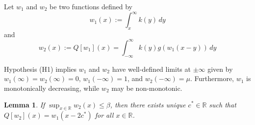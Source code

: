 \documentclass[11pt]{article}
\newtheorem{lem}[thm]{Lemma}
\theoremstyle{definition}
\numberwithin{equation}{section}
\numberwithin{thm}{section}
\renewcommand{\b}{\beta}
\newcommand{\m}{\mu}
\begin{document}
 Let $w_1$ and $w_2$ be two functions defined by
\begin{equation} \label{w1}
w_1(x) := \int_x^\infty k(y) \, dy
\end{equation}
and
\begin{equation} \label{w2}
w_2(x) := Q[w_1](x) = \int_{-\infty}^{\infty} k(y) g(w_1(x-y)) \, dy 
\end{equation}

Hypothesis (H1) implies $w_1$ and $w_2$ have well-defined limits at $\pm\infty$ given by $w_1(\infty)=w_2(\infty)=0$, $w_1(-\infty)=1$, and $w_2(-\infty)=\m$. Furthermore, $w_1$ is monotonically decreasing, while $w_2$ may be non-monotonic.


\begin{lem} \label{lemma1}
If $\sup_{x\in\mathbb R}w_2(x)\leq \b$, then there exists unique $c^*\in\mathbb R$ such that $Q[w_2](x)=w_1(x-2c^*)$ for all $x\in\mathbb R$.
\end{lem}
\end{document}
